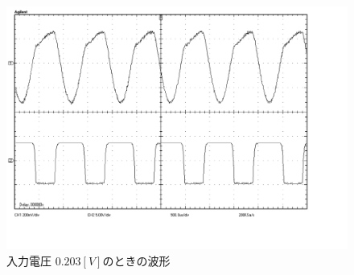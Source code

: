 \documentclass[10pt, a4j, dvipdfmx]{jarticle}
\begin{document}
    \begin{figure}[H]
        \centering
        \includegraphics[height=80mm]{ex-15.bmp}
        \caption{入力電圧 $0.203[V]$のときの波形}
        \label{ex:15}
    \end{figure}

    \newpage
\end{document}
